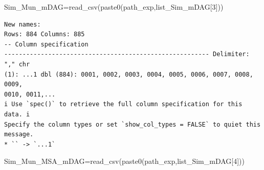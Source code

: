 \documentclass[
  letterpaper,
  DIV=11,
  numbers=noendperiod]{scrreprt}
\newenvironment{Shaded}{\begin{snugshade}}{\end{snugshade}}
\newcommand{\DecValTok}[1]{\textcolor[rgb]{0.68,0.00,0.00}{#1}}
\newcommand{\FunctionTok}[1]{\textcolor[rgb]{0.28,0.35,0.67}{#1}}
\newcommand{\NormalTok}[1]{\textcolor[rgb]{0.00,0.23,0.31}{#1}}
\newcommand{\OtherTok}[1]{\textcolor[rgb]{0.00,0.23,0.31}{#1}}
\newcommand{\SpecialCharTok}[1]{\textcolor[rgb]{0.37,0.37,0.37}{#1}}
\begin{document}
\begin{Shaded}
\end{Shaded}

\begin{Shaded}
\begin{Highlighting}[]
\NormalTok{Sim\_Mun\_mDAG}\OtherTok{=}\FunctionTok{read\_csv}\NormalTok{(}\FunctionTok{paste0}\NormalTok{(path\_exp,list\_Sim\_mDAG[}\DecValTok{3}\NormalTok{]))}
\end{Highlighting}
\end{Shaded}

\begin{verbatim}
New names:
Rows: 884 Columns: 885
-- Column specification
-------------------------------------------------------- Delimiter: "," chr
(1): ...1 dbl (884): 0001, 0002, 0003, 0004, 0005, 0006, 0007, 0008, 0009,
0010, 0011,...
i Use `spec()` to retrieve the full column specification for this data. i
Specify the column types or set `show_col_types = FALSE` to quiet this message.
* `` -> `...1`
\end{verbatim}

\begin{Shaded}
\end{Shaded}

\begin{Shaded}
\begin{Highlighting}[]
\NormalTok{Sim\_Mun\_MSA\_mDAG}\OtherTok{=}\FunctionTok{read\_csv}\NormalTok{(}\FunctionTok{paste0}\NormalTok{(path\_exp,list\_Sim\_mDAG[}\DecValTok{4}\NormalTok{]))}
\end{Highlighting}
\end{Shaded}
\end{document}
